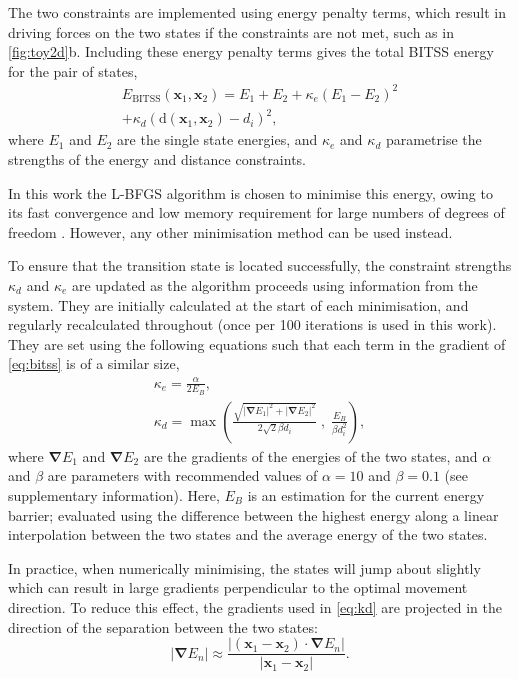 \documentclass[twocolumn,10pt]{revtex4}
\newcommand{\abs}[1]{\left| #1 \right|}
\newcommand{\grad}{\bm{\nabla}}
\begin{document}
The two constraints are implemented using energy penalty terms, which result in driving forces on the two states if the constraints are not met, such as in \cref{fig:toy2d}b.
Including these energy penalty terms gives the total BITSS energy for the pair of states,
\begin{multline}\label{eq:bitss}
  E_\text{BITSS}(\bm{x}_1, \bm{x}_2) = E_1 + E_2
    + \kappa_e \left( E_1 - E_2 \right) ^2 \\
    + \kappa_d \left( \mathrm{d}(\bm{x}_1, \bm{x}_2) - d_i \right) ^2,
\end{multline}
where $E_1$ and $E_2$ are the single state energies, and $\kappa_e$ and $\kappa_d$ parametrise the strengths of the energy and distance constraints.

In this work the L-BFGS algorithm is chosen to minimise this energy, owing to its fast convergence and low memory requirement for large numbers of degrees of freedom \cite{Liu1989}.
However, any other minimisation method can be used instead.

To ensure that the transition state is located successfully, the constraint strengths $\kappa_d$ and $\kappa_e$ are updated as the algorithm proceeds using information from the system.
They are initially calculated at the start of each minimisation, and regularly recalculated throughout (once per 100 iterations is used in this work).
They are set using the following equations such that each term in the gradient of \cref{eq:bitss} is of a similar size,
\begin{gather}
  \kappa_e = \frac {\alpha} {2 E_B},
  \label{eq:ke}
  \\
  \kappa_d = \max \left(
    \frac {\sqrt{\abs{\grad E_1}^2 + \abs{\grad E_2}^2}} {2\sqrt{2} \beta d_i} \; , \;
    \frac{E_B}{\beta d_i^2} \right),
  \label{eq:kd}
\end{gather}
where $\grad E_1$ and $\grad E_2$ are the gradients of the energies of the two states, and $\alpha$ and $\beta$ are parameters with recommended values of $\alpha = 10$ and $\beta = 0.1$ (see supplementary information).
Here, $E_B$ is an estimation for the current energy barrier; evaluated using the difference between the highest energy along a linear interpolation between the two states and the average energy of the two states.

In practice, when numerically minimising, the states will jump about slightly which can result in large gradients perpendicular to the optimal movement direction.
To reduce this effect, the gradients used in \cref{eq:kd} are projected in the direction of the separation between the two states:
\begin{equation}
  \abs{\grad E_n} \approx \frac {\abs{(\bm{x}_1 - \bm{x}_2) \cdot \grad E_n}} {\abs{\bm{x}_1 - \bm{x}_2}}.
\end{equation}
\end{document}
